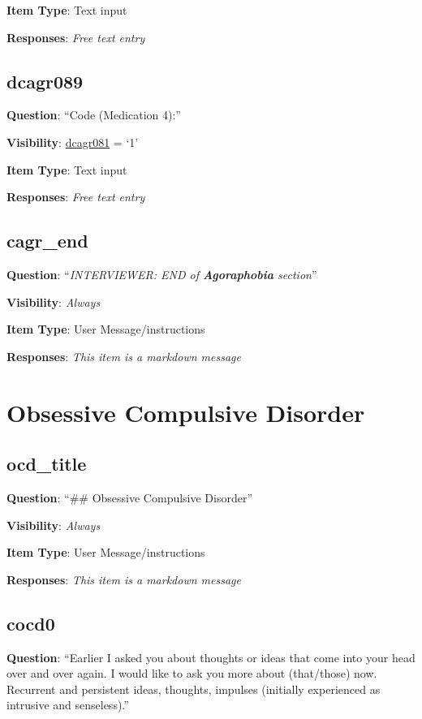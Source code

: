 \documentclass[]{book}
\begin{document}
\textbf{Item Type}: Text input

\textbf{Responses}: \emph{Free text entry}

\hypertarget{dcagr089}{%
\section{dcagr089}\label{dcagr089}}

\textbf{Question}: ``Code (Medication 4):''

\textbf{Visibility}: \protect\hyperlink{dcagr081}{dcagr081} = `1'

\textbf{Item Type}: Text input

\textbf{Responses}: \emph{Free text entry}

\hypertarget{cagr_end}{%
\section{cagr\_end}\label{cagr_end}}

\textbf{Question}: ``\emph{INTERVIEWER: END of \textbf{Agoraphobia} section}''

\textbf{Visibility}: \emph{Always}

\textbf{Item Type}: User Message/instructions

\textbf{Responses}: \emph{This item is a markdown message}

\hypertarget{ocd_section}{%
\chapter{Obsessive Compulsive Disorder}\label{ocd_section}}

\hypertarget{ocd_title}{%
\section{ocd\_title}\label{ocd_title}}

\textbf{Question}: ``\#\# Obsessive Compulsive Disorder''

\textbf{Visibility}: \emph{Always}

\textbf{Item Type}: User Message/instructions

\textbf{Responses}: \emph{This item is a markdown message}

\hypertarget{cocd0}{%
\section{cocd0}\label{cocd0}}

\textbf{Question}: ``Earlier I asked you about thoughts or ideas that come into your head over and over again. I would like to ask you more about (that/those) now. Recurrent and persistent ideas, thoughts, impulses (initially experienced as intrusive and senseless).''
\end{document}
